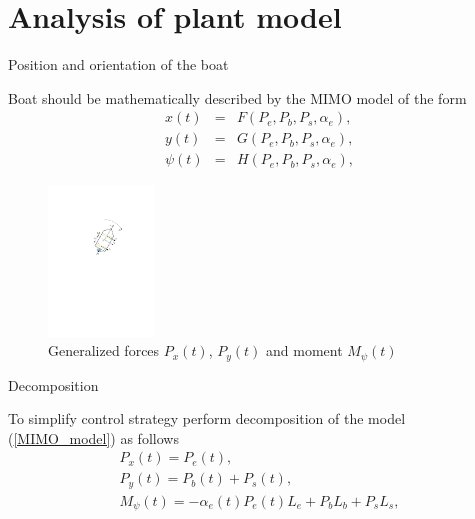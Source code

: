 \documentclass[10pt,pdf,hyperref={unicode}]{beamer}
\begin{document}
\section {Analysis of plant model}

\begin{frame}{Position and orientation of the boat}
	
	
	Boat should be mathematically described by the MIMO model of the form
	\begin{eqnarray}
	\label{MIMO_model}
	x(t)&=&F(P_e, P_b, P_s, \alpha_e),\\
	y(t)&=&G(P_e, P_b, P_s, \alpha_e),\\
	\psi(t)&=&H(P_e, P_b, P_s, \alpha_e),
	\end{eqnarray}
	
	\begin{figure}
		\centering
		\includegraphics[height=4cm]{configuration}
		\caption{Generalized forces $P_x(t)$, $P_y(t)$ and moment $M_\psi(t)$}
	\end{figure}

\end{frame}


\begin{frame}{Decomposition}

To simplify control strategy perform decomposition of the model (\ref{MIMO_model}) as follows
\begin{eqnarray}
\label{decomposition}
&P_x(t)=P_e(t),&\\
&P_y(t)=P_b(t)+P_s(t),&\\
&M_\psi(t)=-\alpha_e(t)P_e(t)L_e+P_bL_b+P_sL_s,&
\end{eqnarray}


\end{frame}
\end{document}
